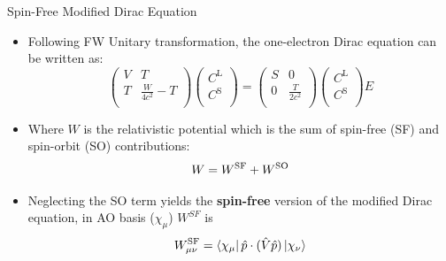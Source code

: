 \documentclass[t]{beamer}
\newcommand{\bra}[2][0]
{\ifthenelse{\equal{#1}{0}}{\left\langle #2 \right|}
{\ifthenelse{\equal{#1}{1}}{\big\langle #2 \big|}
{\ifthenelse{\equal{#1}{2}}{\Big\langle #2 \Big|}
{\ifthenelse{\equal{#1}{3}}{\bigg\langle #2 \bigg|}
{\ifthenelse{\equal{#1}{4}}{\Bigg\langle #2 \Bigg|}
{Error}}}}}
}
\newcommand{\ket}[2][0]
{\ifthenelse{\equal{#1}{0}}{\left| #2 \right\rangle}
{\ifthenelse{\equal{#1}{1}}{\big| #2 \big\rangle}
{\ifthenelse{\equal{#1}{2}}{\Big| #2 \Big\rangle}
{\ifthenelse{\equal{#1}{3}}{\bigg| #2 \bigg\rangle}
{\ifthenelse{\equal{#1}{4}}{\Bigg| #2 \Bigg\rangle}
{Error}}}}}
}
\begin{document}
\begin{frame}{Spin-Free Modified Dirac Equation}
\begin{itemize}
\item Following FW Unitary transformation, the one-electron Dirac equation can be written as:
\begin{equation}
\left(
\begin{array}{cc}
{V}                   &  {T} \\
{T} & \frac{W}{4c^2}-{T} \\ 
\end{array}
\right)
\left(
\begin{array}{c}
{C}^{\text{L}}                   \\
{C}^{\text{S}}  \\ 
\end{array}
\right)  
= \left(
\begin{array}{cc}
{S}                  &  {0}\\
{0} & \frac{{T}}{2c^2} \\ 
\end{array}
\right)
\left(
\begin{array}{c}
{C}^{\text{L}}                    \\
{C}^{\text{S}}  \\ 
\end{array}
\right)  E
\end{equation}
\item Where $W$ is the relativistic potential which is the sum of spin-free (SF) and spin-orbit (SO) contributions:
\begin{equation}
W = W^{\rm SF} + W^{\rm SO}
\end{equation}
\item Neglecting the SO term yields the \textbf{spin-free} version of the modified Dirac equation, in AO basis ($\chi_{\mu}$) $W^{SF}$ is
\begin{equation}
W^{\rm SF}_{\mu\nu} = \bra{\chi_\mu} \hat{p}\cdot (\hat{V}\hat{p}) \ket{\chi_\nu}
\end{equation}
\end{itemize}
\end{frame}
\end{document}
